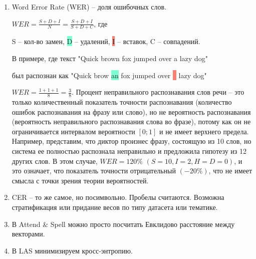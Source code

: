 \begin{enumerate}
    \item Word Error Rate (WER) -- доля ошибочных слов. 
    
    $WER = \frac{S+D+I}{N}=\frac{S+D+I}{S+D+C}$, где 
    
    \colorbox{Apricot}{S} -- кол-во замен, \colorbox{Aquamarine}{D} -- удалений, \colorbox{Salmon}{I} -- вставок, C -- совпадений.
    
    В примере, где текст "Quick brown fox jumped over a lazy dog" 
    
    был распознан как "Quick \colorbox{Apricot}{brow} \colorbox{Aquamarine}{an} fox jumped over \colorbox{Salmon}{\textcolor{Salmon}{a}} lazy dog" 
    
    $WER = \frac{1+1+1}{8}=\frac{3}{8}$. Процент неправильного распознавания слов речи – это только количественный показатель точности распознавания (количество ошибок распознавания на фразу или слово), но не вероятность распознавания (вероятность неправильного распознавания слова во фразе), потому как он не ограничивается интервалом вероятности $[0; 1]$ и не имеет верхнего предела. Например, представим, что диктор произнес фразу, состоящую из 10 слов, но система ее полностью распознала неправильно и предложила гипотезу из 12 других слов. В этом случае, $WER=120 \%$ $(S=10, I=2, H=D=0)$, и это означает, что показатель точности отрицательный $(-20\%)$, что не имеет смысла с точки зрения теории вероятностей.
    \item CER -- то же самое, но посимвольно. Пробелы считаются. Возможна стратификация или придание весов по типу датасета или тематике.
    \item В Attend \& Spell можно просто посчитать Евклидово расстояние между векторами.
    \item В LAS минимизируем кросс-энтропию.
\end{enumerate}

